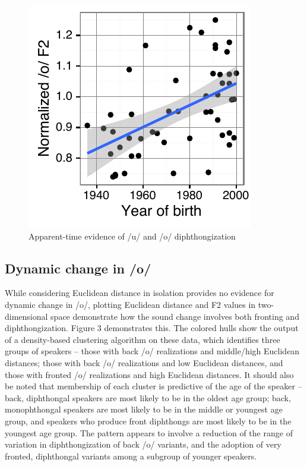 \documentclass[PWPL]{article}
\begin{document}
\begin{figure}[ht]
\includegraphics[scale=0.7]{ow_yob_small.pdf}
\caption{Apparent-time evidence of /u/ and /o/ diphthongization}
\end{figure}
\subsection{Dynamic change in /o/}

While considering Euclidean distance in isolation provides no evidence for dynamic change in /o/, plotting Euclidean distance and F2 values in two-dimensional space demonstrate how the sound change involves both fronting and diphthongization. Figure 3 demonstrates this.  The colored hulls show the output of a density-based clustering algorithm on these data, which identifies three groups of speakers -- those with back /o/ realizations and middle/high Euclidean distances; those with back /o/ realizations and low Euclidean distances, and those with fronted /o/ realizations and high Euclidean distances. It should also be noted that membership of each cluster is predictive of the age of the speaker --  back, diphthongal speakers are most likely to be in the oldest age group; back, monophthongal speakers are most likely to be in the middle or youngest age group, and speakers who produce front diphthongs are most likely to be in the youngest age group. The pattern appears to involve a reduction of the range of variation in diphthongization of back /o/ variants, and the adoption of very fronted, diphthongal variants among a subgroup of younger speakers. 
\end{document}
